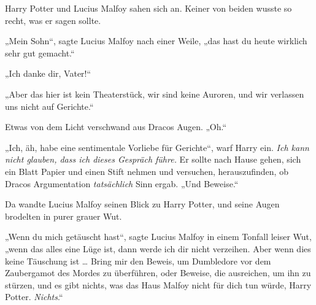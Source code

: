 Harry Potter und Lucius Malfoy sahen sich an.
Keiner von beiden wusste so recht, was er sagen sollte.

„Mein Sohn“, sagte Lucius Malfoy nach einer Weile, „das hast du heute wirklich sehr gut gemacht.“

„Ich danke dir, Vater!“

„Aber das hier ist kein Theaterstück, wir sind keine Auroren, und wir verlassen uns nicht auf Gerichte.“

Etwas von dem Licht verschwand aus Dracos Augen.
„Oh.“

„Ich, äh, habe eine sentimentale Vorliebe für Gerichte“, warf Harry ein.
\emph{Ich kann nicht glauben, dass ich dieses Gespräch führe.} Er sollte nach Hause gehen, sich ein Blatt Papier und einen Stift nehmen und versuchen, herauszufinden, ob Dracos Argumentation \emph{tatsächlich} Sinn ergab.
„Und Beweise.“

Da wandte Lucius Malfoy seinen Blick zu Harry Potter, und seine Augen brodelten in purer grauer Wut.

„Wenn du mich getäuscht hast“, sagte Lucius Malfoy in einem Tonfall leiser Wut, „wenn das alles eine Lüge ist, dann werde ich dir nicht verzeihen. Aber wenn dies keine Täuschung ist … Bring mir den Beweis, um Dumbledore vor dem Zaubergamot des Mordes zu überführen, oder Beweise, die ausreichen, um ihn zu stürzen, und es gibt nichts, was das Haus Malfoy nicht für dich tun würde, Harry Potter. \emph{Nichts}.“


